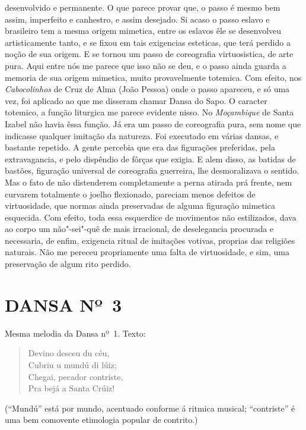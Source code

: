desenvolvido e permanente. O que parece provar que, o passo é mesmo bem
assim, imperfeito e canhestro, e assim desejado. Si acaso o passo eslavo
e brasileiro tem a mesma origem mimetica, entre os eslavos êle se
desenvolveu artisticamente tanto, e se fixou em tais exigencias
esteticas, que terá perdido a noção de sua origem. E se tornou um passo
de coreografia virtuosistica, de arte pura. Aqui entre nós me parece que
isso não se deu, e o passo ainda guarda a memoria de sua origem
mimetica, muito provavelmente totemica. Com efeito, nos
\emph{Cabocolinhos} de Cruz de Alma (João Pessoa) onde o passo apareceu,
e só uma vez, foi aplicado ao que me disseram chamar Dansa do Sapo. O
caracter totemico, a função liturgica me parece evidente nisso. No
\emph{Moçambique} de Santa Izabel não havia êssa função. Já era um passo
de coreografia pura, sem nome que indicasse qualquer imitação da
natureza. Foi executado em várias dansas, e bastante repetido. A gente
percebia que era das figurações preferidas, pela extravagancia, e pelo
dispêndio de fôrças que exigia. E alem disso, as batidas de bastões,
figuração universal de coreografia guerreira, lhe desmoralizava o
sentido. Mas o fato de não distenderem completamente a perna atirada prá
frente, nem curvarem totalmente o joelho flexionado, pareciam menos
defeitos de virtuosidade, que normas ainda preservadas de alguma
figuração mimetica esquecida. Com efeito, toda essa esquerdice de
movimentos não estilizados, dava ao corpo um não"-sei"-quê de mais
irracional, de deselegancia procurada e necessaria, de enfim, exigencia
ritual de imitações votivas, proprias das religiões naturais. Não me
pereceu propriamente uma falta de virtuosidade, e sim, uma preservação
de algum rito perdido.

\pagebreak

\section{DANSA Nº~3}

Mesma melodia da Dansa nº~1. Texto:

\begin{verse}
Devino desceu du céu,\\
Cubriu u mundú di lúiz;\\
Chegai, pecador contriste,\\
Pra bejá a Santa Crúiz!
\end{verse}
(``Mundú'' está por mundo, acentuado conforme á ritmica musical;
``contriste'' é uma bem comovente etimologia popular de contrito.)


